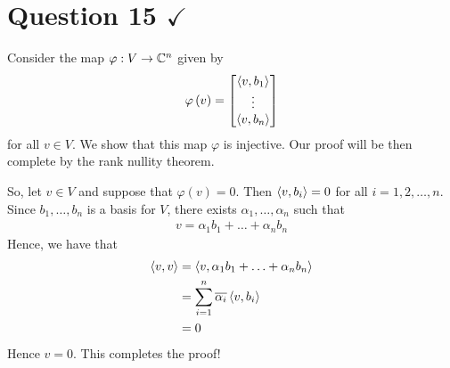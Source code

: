 \section{Question 15 \texorpdfstring{$\checkmark$}{}}
Consider the map $\varphi : V \to \mathbb C ^{n}$ given by 
\begin{align*}
    \varphi \left( v \right)
    =
    \begin{bmatrix}
	\left\langle v, b_{1} \right\rangle \\
	\vdots \\
	\left\langle v, b_{n} \right\rangle
    \end{bmatrix}
\end{align*}
for all $v\in V$. We show that this map $\varphi$ is injective. Our proof will be then complete by the rank nullity theorem.

So, let $v\in V$ and suppose that $\varphi \left( v \right) = 0$. Then $\left\langle v, b_{i} \right\rangle = 0$ for all $i=1,2, \ldots,  n$. Since $b_{1} , \ldots , b_{n}$ is a basis for $V$, there exists $\alpha _{1} , \ldots , \alpha _{n}$ such that
\begin{align*}
    v= \alpha_{1} b_{1} + \ldots + \alpha _{n} b_{n}
\end{align*}
Hence, we have that 
\begin{align*}
    \left\langle v, v \right\rangle &= \left\langle v, \alpha_{1} b_{1} + \ldots + \alpha _{n} b_{n}  \right\rangle \\
    &= \sum_{i=1}^{n} \overline{\alpha_{i}} \left\langle v, b_{i} \right\rangle \\
    &= 0
\end{align*}
Hence $v=0$. This completes the proof!
